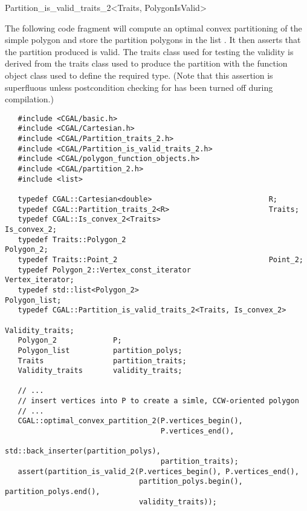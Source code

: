 \begin{ccRefClass}{Partition_is_valid_traits_2<Traits, PolygonIsValid>}
\ccExample

The following code fragment will compute an optimal
convex partitioning of the simple polygon 
and store the partition polygons in the list .
It then asserts that the partition produced is valid.  The
traits class used for testing the validity is derived from the
traits class used to produce the partition with the function object
class  used 
to define the required  type.  (Note that
this assertion is superfluous unless postcondition checking for
 has been turned off during compilation.)

\begin{verbatim}
   #include <CGAL/basic.h>
   #include <CGAL/Cartesian.h>
   #include <CGAL/Partition_traits_2.h>
   #include <CGAL/Partition_is_valid_traits_2.h>
   #include <CGAL/polygon_function_objects.h>
   #include <CGAL/partition_2.h>
   #include <list>

   typedef CGAL::Cartesian<double>                           R;
   typedef CGAL::Partition_traits_2<R>                       Traits;
   typedef CGAL::Is_convex_2<Traits>                         Is_convex_2;
   typedef Traits::Polygon_2                                 Polygon_2;
   typedef Traits::Point_2                                   Point_2;
   typedef Polygon_2::Vertex_const_iterator                  Vertex_iterator;
   typedef std::list<Polygon_2>                              Polygon_list;
   typedef CGAL::Partition_is_valid_traits_2<Traits, Is_convex_2>
                                                             Validity_traits;
   Polygon_2             P;
   Polygon_list          partition_polys;
   Traits                partition_traits;
   Validity_traits       validity_traits;

   // ...
   // insert vertices into P to create a simle, CCW-oriented polygon
   // ...
   CGAL::optimal_convex_partition_2(P.vertices_begin(),
                                    P.vertices_end(),
                                    std::back_inserter(partition_polys),
                                    partition_traits);
   assert(partition_is_valid_2(P.vertices_begin(), P.vertices_end(),
                               partition_polys.begin(), partition_polys.end(),
                               validity_traits));
\end{verbatim}


\end{ccRefClass}
\def\ccRefPageBegin{\ccParDims\cgalColumnLayout}
\def\ccRefPageEnd{\ccParDims\cgalColumnLayout}


